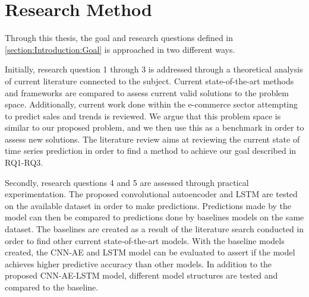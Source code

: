 \section{Research Method}
\label{section:Introduction:research-method}

Through this thesis, the goal and research questions defined in \autoref{section:Introduction:Goal} is approached in two different ways.

Initially, research question 1 through 3 is addressed through a theoretical analysis of current literature connected to the subject.
Current state-of-the-art methods and frameworks are compared to assess current valid solutions to the problem space.
Additionally, current work done within the e-commerce sector attempting to predict sales and trends is reviewed.
We argue that this problem space is similar to our proposed problem, and we then use this as a benchmark in order to assess new solutions.
The literature review aims at reviewing the current state of time series prediction in order to find a method to achieve our goal described in RQ1-RQ3.

Secondly, research questions 4 and 5 are assessed through practical experimentation.
The proposed convolutional autoencoder and LSTM are tested on the available dataset in order to make predictions.
Predictions made by the model can then be compared to predictions done by baselines models on the same dataset.
The baselines are created as a result of the literature search conducted in order to find other current state-of-the-art models.
With the baseline models created, the CNN-AE and LSTM model can be evaluated to assert if the model achieves higher predictive accuracy than other models.
In addition to the proposed CNN-AE-LSTM model,
different model structures are tested and compared to the baseline.



\iffalse
  This thesis approaches the goal and research questions through theoretical analysis
  of the problem space.
  Primarily the focus of this thesis is to conduct a review and analysis of current literature.
  Reviewing the current state-of-the-art methods for predictive analysis of time series,
  as well as new experimental methods and frameworks.
  Additionally, we review the current work done within the E-commerce sector attempting to predict sales and trends.
  We argue that this problem space is similar to our proposed problem, and we thus use this as a benchmark in order to assess new solutions.
  The literature review aims at reviewing the current state of time series prediction,
  in order to best find a method to achieve our goal described above.
\fi


